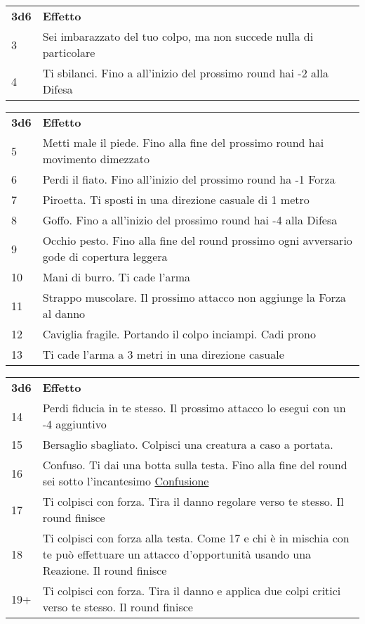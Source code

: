 {{\begin{multicols}{2}
\begin{tabularx}{0.5\textwidth}{l|X}
\textbf{3d6} & \textbf{Effetto}\\
3& Sei imbarazzato del tuo colpo, ma non succede nulla di particolare\\
4& Ti sbilanci. Fino a all'inizio del prossimo round hai -2 alla Difesa\\
\end{tabularx}
\begin{tabularx}{0.5\textwidth}{l|X}
\textbf{3d6} & \textbf{Effetto}\\
5& Metti male il piede. Fino alla fine del prossimo round hai movimento dimezzato\\
6& Perdi il fiato. Fino all'inizio del prossimo round ha -1 Forza\\
7& Piroetta. Ti sposti in una direzione casuale di 1 metro\\
8& Goffo. Fino a all'inizio del prossimo round hai -4 alla Difesa\\
9& Occhio pesto. Fino alla fine del round prossimo ogni avversario gode di copertura leggera\\
10 & Mani di burro. Ti cade l'arma\\
11 & Strappo muscolare. Il prossimo attacco non aggiunge la Forza al danno\\
12 & Caviglia fragile. Portando il colpo inciampi. Cadi prono\\
13 & Ti cade l'arma a 3 metri in una direzione casuale\\
\end{tabularx}
\begin{tabularx}{0.5\textwidth}{l|X}
\textbf{3d6} & \textbf{Effetto}\\
14 & Perdi fiducia in te stesso. Il prossimo attacco lo esegui con un -4 aggiuntivo\\
15 & Bersaglio sbagliato. Colpisci una creatura a caso a portata.\\ 
16 & Confuso. Ti dai una botta sulla testa. Fino alla fine del round sei sotto l'incantesimo \hyperlink{Confusione}{Confusione}\\
17 & Ti colpisci con forza. Tira il danno regolare verso te stesso. Il round finisce\\
18 & Ti colpisci con forza alla testa. Come 17 e chi è in mischia con te può effettuare un attacco d'opportunità usando una Reazione. Il round finisce\\
19+& Ti colpisci con forza. Tira il danno e applica due colpi critici verso te stesso. Il round finisce
\end{tabularx}


\end{multicols}}}
